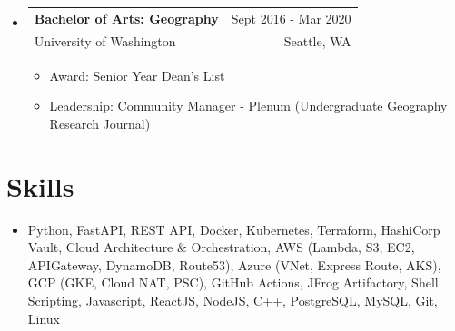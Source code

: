 \documentclass[a4paper,11pt]{article}
\makeatletter
\newcommand{\resumeEdu}[4]{
\vspace{0mm}\item[]
    \begin{tabular*}{\textwidth}[t]{l@{\extracolsep{\fill}}r}
        \hspace{-4.3mm} \small\textbf{#1} & \footnotesize{#3}\vspace{-1mm} \\
        \hspace{-4.3mm} \footnotesize{#2} & \footnotesize{#4}
    \end{tabular*}
    \vspace{-3.2mm}
}
\newcommand{\resumeSubHeadingListStart}{\begin{itemize}[leftmargin=*,labelsep=0mm,itemsep=-1.5mm]}
\newcommand{\resumeItemListStart}{\begin{justify}\begin{itemize}[leftmargin=3ex, rightmargin=2ex, noitemsep,labelsep=1.2mm,itemsep=1pt]\small}
\newcommand{\resumeSubHeadingListEnd}{\end{itemize}\vspace{-2mm}}
\newcommand{\resumeItemListEnd}{\end{itemize}\end{justify}\vspace{-1.5mm}}
\makeatother
\begin{document}
\vspace{-6.0mm}

\resumeSubHeadingListStart
\resumeEdu
{Bachelor of Arts: Geography}
{University of Washington} 
{Sept 2016 - Mar 2020}
{Seattle, WA}
\vspace{-2.0mm}
\resumeItemListStart
\item[$\bullet$] Award: Senior Year Dean's List
\item[$\bullet$] Leadership: Community Manager - Plenum (Undergraduate Geography Research Journal)
\resumeItemListEnd
\resumeSubHeadingListEnd

\vspace{-5mm}

\section{Skills}

\begin{itemize}[left=0pt, itemsep=-1mm]\small
    \item Python, FastAPI, REST API, Docker, Kubernetes, Terraform, HashiCorp Vault, Cloud Architecture \& Orchestration, AWS (Lambda, S3, EC2, APIGateway, DynamoDB, Route53), Azure (VNet, Express Route, AKS), GCP (GKE, Cloud NAT, PSC), GitHub Actions, JFrog Artifactory, Shell Scripting, Javascript, ReactJS, NodeJS, C++, PostgreSQL, MySQL, Git, Linux
\end{itemize}


\end{document}
